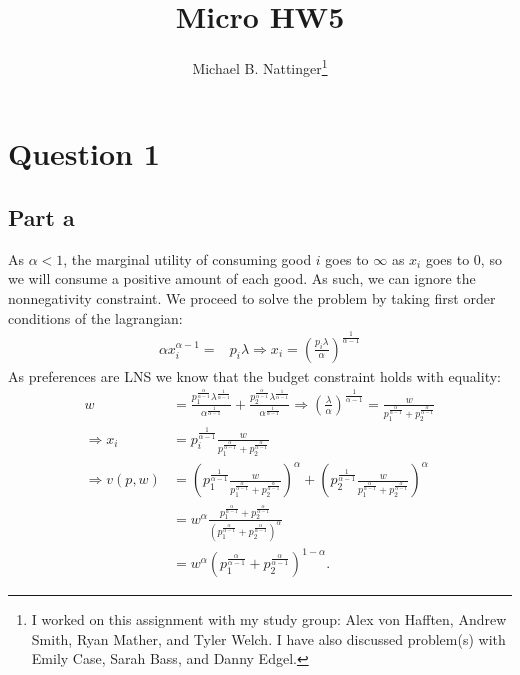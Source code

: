 \documentclass[11pt]{article} %
\title{Micro HW5}
\author{Michael B. Nattinger\footnote{I worked on this assignment with my study group: Alex von Hafften, Andrew Smith, Ryan Mather, and Tyler Welch. I have also discussed problem(s) with Emily Case, Sarah Bass, and Danny Edgel.}}
\begin{document}
\maketitle

\section{Question 1}
\subsection{Part a}
As $\alpha<1$, the marginal utility of consuming good $i$ goes to $\infty$ as $x_i$ goes to 0, so we will consume a positive amount of each good. As such, we can ignore the nonnegativity constraint. We proceed to solve the problem by taking first order conditions of the lagrangian:
\begin{align*}
\alpha x_i^{\alpha-1} =& p_i\lambda \Rightarrow x_i = \left(\frac{p_i\lambda}{\alpha}\right)^{\frac{1}{\alpha-1}}
\end{align*}
As preferences are LNS we know that the budget constraint holds with equality:
\begin{align*}
w &= \frac{p_1^{\frac{\alpha}{\alpha-1}}\lambda^{\frac{1}{\alpha-1}}}{\alpha^{\frac{1}{\alpha-1}}} + \frac{p_2^{\frac{\alpha}{\alpha-1}}\lambda^{\frac{1}{\alpha-1}}}{\alpha^{\frac{1}{\alpha-1}}} \Rightarrow \left(\frac{\lambda}{\alpha}\right)^{\frac{1}{\alpha-1}} = \frac{w}{p_1^{\frac{\alpha}{\alpha-1}}+p_2^{\frac{\alpha}{\alpha-1}}}\\
\Rightarrow x_i &= p_i^{\frac{1}{\alpha-1}} \frac{w}{p_1^{\frac{\alpha}{\alpha-1}}+p_2^{\frac{\alpha}{\alpha-1}}}\\
\Rightarrow v(p,w) &= \left( p_1^{\frac{1}{\alpha-1}} \frac{w}{p_1^{\frac{\alpha}{\alpha-1}}+p_2^{\frac{\alpha}{\alpha-1}}}\right)^{\alpha} + \left( p_2^{\frac{1}{\alpha-1}} \frac{w}{p_1^{\frac{\alpha}{\alpha-1}}+p_2^{\frac{\alpha}{\alpha-1}}}\right)^{\alpha} \\
&= w^{\alpha} \frac{p_1^{\frac{\alpha}{\alpha-1}}+p_2^{\frac{\alpha}{\alpha-1}}}{\left( p_1^{\frac{\alpha}{\alpha-1}}+p_2^{\frac{\alpha}{\alpha-1}}\right)^{\alpha}}\\
&= w^{\alpha}\left( p_1^{\frac{\alpha}{\alpha-1}}+p_2^{\frac{\alpha}{\alpha-1}} \right)^{1-\alpha}.
\end{align*}
\end{document}
